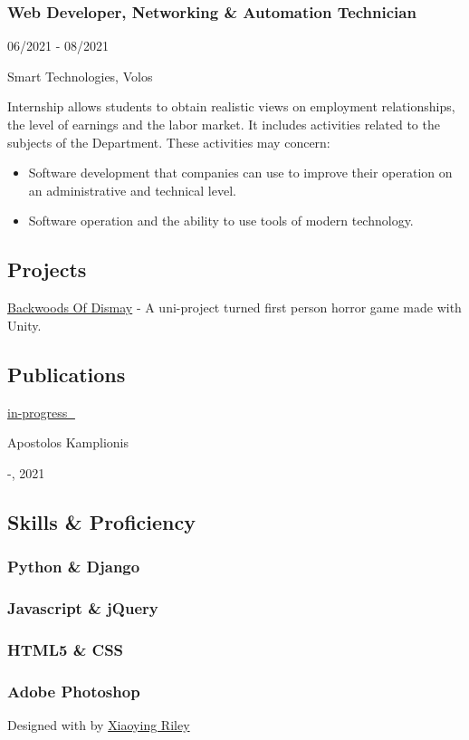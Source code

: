 \documentclass[]{article}
\providecommand{\tightlist}{%
  \setlength{\itemsep}{0pt}\setlength{\parskip}{0pt}}
\begin{document}
\subsubsection{Web Developer, Networking \& Automation
Technician}\label{web-developer-networking-automation-technician}

06/2021 - 08/2021

Smart Technologies, Volos

Internship allows students to obtain realistic views on employment
relationships, the level of earnings and the labor market. It includes
activities related to the subjects of the Department. These activities
may concern:

\begin{itemize}
\tightlist
\item
  Software development that companies can use to improve their operation
  on an administrative and technical level.
\item
  Software operation and the ability to use tools of modern technology.
\end{itemize}

\subsection{\texorpdfstring{{ \emph{} \emph{} }
Projects}{    Projects}}\label{projects}

{ \protect\hyperlink{}{Backwoods Of Dismay} } - {A uni-project turned
first person horror game made with Unity.}

\subsection{\texorpdfstring{{ \emph{} \emph{} }
Publications}{    Publications}}\label{publications}

\protect\hyperlink{}{in-progress 🚧}

Apostolos Kamplionis

-, 2021

\subsection{\texorpdfstring{{ \emph{} \emph{} } Skills \&
Proficiency}{    Skills \& Proficiency}}\label{skills-proficiency}

\subsubsection{Python \& Django}\label{python-django}

\subsubsection{Javascript \& jQuery}\label{javascript-jquery}

\subsubsection{HTML5 \& CSS}\label{html5-css}

\subsubsection{Adobe Photoshop}\label{adobe-photoshop}

Designed with \emph{} by \href{http://themes.3rdwavemedia.com/}{Xiaoying
Riley}
\end{document}
